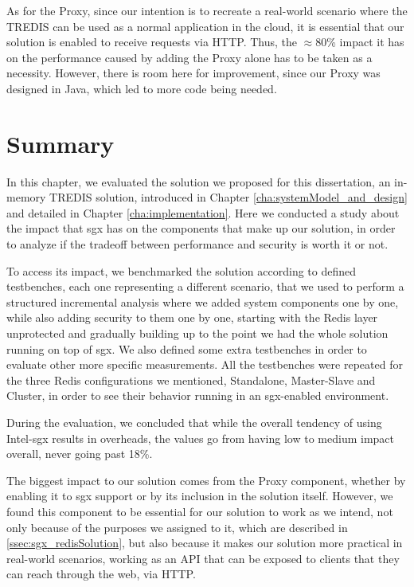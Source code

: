 As for the Proxy, since our intention is to recreate a real-world scenario where the TREDIS can be used as a normal application in the cloud, it is essential that our solution is enabled to receive requests via HTTP. Thus, the $\approx$80\% impact it has on the performance caused by adding the Proxy alone has to be taken as a necessity. However, there is room here for improvement, since our Proxy was designed in Java, which led to more code being needed. 

\section{Summary}

In this chapter, we evaluated the solution we proposed for this dissertation, an in-memory TREDIS solution, introduced in Chapter \ref{cha:systemModel_and_design} and detailed in Chapter \ref{cha:implementation}. Here we conducted a study about the impact that \gls{sgx} has on the components that make up our solution, in order to analyze if the tradeoff between performance and security is worth it or not. 

To access its impact, we benchmarked the solution according to defined testbenches, each one representing a different scenario, that we used to perform a structured incremental analysis where we added system components one by one, while also adding security to them one by one, starting with the Redis layer unprotected and gradually building up to the point we had the whole solution running on top of \gls{sgx}. We also defined some extra testbenches in order to evaluate other more specific measurements. All the testbenches were repeated for the three Redis configurations we mentioned, Standalone, Master-Slave and Cluster, in order to see their behavior running in an \gls{sgx}-enabled environment.

During the evaluation, we concluded that while the overall tendency of using Intel-\gls{sgx} results in overheads, the values go from having low to medium impact overall, never going past 18\%. 

The biggest impact to our solution comes from the Proxy component, whether by enabling it to \gls{sgx} support or by its inclusion in the solution itself. However, we found this component to be essential for our solution to work as we intend, not only because of the purposes we assigned to it, which are described in \ref{ssec:sgx_redisSolution}, but also because it makes our solution more practical in real-world scenarios, working as an API that can be exposed to clients that they can reach through the web, via HTTP.

